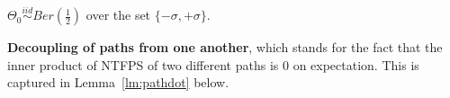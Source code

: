 \begin{assumption}\label{assmp:maintwo}
$\Theta_0\stackrel{iid}\sim Ber(\frac{1}{2})$ over the set $\{-\sigma,+\sigma\}$. 
\end{assumption}
\textbf{Decoupling of paths from one another}, which stands for the fact that the inner product of NTFPS of two different paths is $0$ on expectation. This is captured in Lemma~\ref{lm:pathdot} below.

\FloatBarrier
\begin{figure}[h]
\end{figure}
